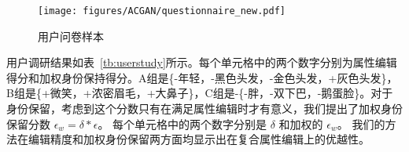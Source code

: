 





\begin{figure}[!t]
    \begin{center}
         \texttt{[image: figures/ACGAN/questionnaire\_new.pdf]}
    \end{center}
    \caption{用户问卷样本}
    \label{fig:questionnaire}
\end{figure}

用户调研结果如表~\ref{tb:userstudy}所示。每个单元格中的两个数字分别为属性编辑得分和加权身份保持得分。A组是\{-年轻，-黑色头发，-金色头发，+灰色头发\}，B组是\{+微笑，+浓密眉毛，+大鼻子\}，C组是-\{-胖，-双下巴，-鹅蛋脸\}。对于身份保留，考虑到这个分数只有在满足属性编辑时才有意义，我们提出了加权身份保留分数 $\epsilon_w = \delta * \epsilon$。 每个单元格中的两个数字分别是 $\delta$ 和加权的 $\epsilon_w$。 我们的方法在编辑精度和加权身份保留两方面均显示出在复合属性编辑上的优越性。 


